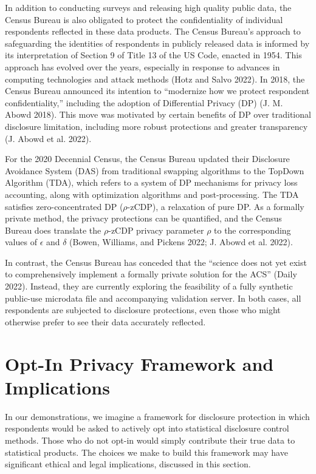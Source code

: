 \documentclass[
]{urban-formatting}
\begin{document}
In addition to conducting surveys and releasing high quality public
data, the Census Bureau is also obligated to protect the confidentiality
of individual respondents reflected in these data products. The Census
Bureau's approach to safeguarding the identities of respondents in
publicly released data is informed by its interpretation of Section 9 of
Title 13 of the US Code, enacted in 1954. This approach has evolved over
the years, especially in response to advances in computing technologies
and attack methods (Hotz and Salvo 2022). In 2018, the Census Bureau
announced its intention to ``modernize how we protect respondent
confidentiality,'' including the adoption of Differential Privacy (DP)
(J. M. Abowd 2018). This move was motivated by certain benefits of DP
over traditional disclosure limitation, including more robust
protections and greater transparency (J. Abowd et al. 2022).

For the 2020 Decennial Census, the Census Bureau updated their
Disclosure Avoidance System (DAS) from traditional swapping algorithms
to the TopDown Algorithm (TDA), which refers to a system of DP
mechanisms for privacy loss accounting, along with optimization
algorithms and post-processing. The TDA satisfies zero-concentrated DP
(\(\rho\)-zCDP), a relaxation of pure DP. As a formally private method,
the privacy protections can be quantified, and the Census Bureau does
translate the \(\rho\)-zCDP privacy parameter \(\rho\) to the
corresponding values of \(\epsilon\) and \(\delta\) (Bowen, Williams,
and Pickens 2022; J. Abowd et al. 2022).

In contrast, the Census Bureau has conceded that the ``science does not
yet exist to comprehensively implement a formally private solution for
the ACS'' (Daily 2022). Instead, they are currently exploring the
feasibility of a fully synthetic public-use microdata file and
accompanying validation server. In both cases, all respondents are
subjected to disclosure protections, even those who might otherwise
prefer to see their data accurately reflected.

\section{Opt-In Privacy Framework and Implications}

In our demonstrations, we imagine a framework for disclosure protection
in which respondents would be asked to actively opt into statistical
disclosure control methods. Those who do not opt-in would simply
contribute their true data to statistical products. The choices we make
to build this framework may have significant ethical and legal
implications, discussed in this section.
\end{document}
